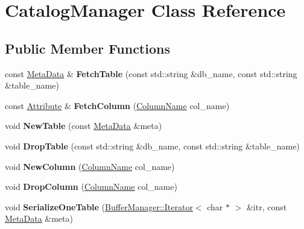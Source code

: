\hypertarget{class_catalog_manager}{}\section{Catalog\+Manager Class Reference}
\label{class_catalog_manager}
\subsection*{Public Member Functions}
\begin{DoxyCompactItemize}
\item 
\mbox{\label{class_catalog_manager_a78d28bcfdef16c00ffd8a1b5492571c0}} 
const \mbox{\hyperlink{struct_meta_data}{Meta\+Data}} \& {\bfseries Fetch\+Table} (const std\+::string \&db\+\_\+name, const std\+::string \&table\+\_\+name)
\item 
\mbox{\label{class_catalog_manager_a888a24b88f366bfa75e038fac7dbf13d}} 
const \mbox{\hyperlink{struct_attribute}{Attribute}} \& {\bfseries Fetch\+Column} (\mbox{\hyperlink{struct_column_name}{Column\+Name}} col\+\_\+name)
\item 
\mbox{\label{class_catalog_manager_a01af7632802b69d0b94d010038c04b61}} 
void {\bfseries New\+Table} (const \mbox{\hyperlink{struct_meta_data}{Meta\+Data}} \&meta)
\item 
\mbox{\label{class_catalog_manager_a6691fedf4636ccb6458bfaf58be0f9f6}} 
void {\bfseries Drop\+Table} (const std\+::string \&db\+\_\+name, const std\+::string \&table\+\_\+name)
\item 
\mbox{\label{class_catalog_manager_a38247db9616049d45471f932cb56f60b}} 
void {\bfseries New\+Column} (\mbox{\hyperlink{struct_column_name}{Column\+Name}} col\+\_\+name)
\item 
\mbox{\label{class_catalog_manager_a76dadf7aa79fe1b6e8785b63c1501335}} 
void {\bfseries Drop\+Column} (\mbox{\hyperlink{struct_column_name}{Column\+Name}} col\+\_\+name)
\item 
\mbox{\label{class_catalog_manager_a91a84d275347a0ec43afc4c3539f908f}} 
void {\bfseries Serialize\+One\+Table} (\mbox{\hyperlink{class_buffer_manager_1_1_iterator}{Buffer\+Manager\+::\+Iterator}}$<$ char $\ast$ $>$ \&itr, const \mbox{\hyperlink{struct_meta_data}{Meta\+Data}} \&meta)

\end{DoxyCompactItemize}
